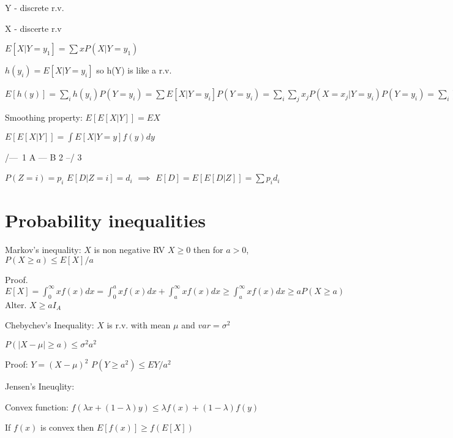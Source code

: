 \documentclass{article}
\begin{document}
Y - discrete r.v.

X - discerte r.v

$E[X|Y=y_1] = \sum x P(X|Y=y_1)$

$h(y_i) = E[X|Y=y_i]$ so h(Y) is like a r.v.

$E[h(y)] = \sum_i h(y_i)P(Y=y_i) = \sum E[X|Y=y_i]P(Y=y_i)  = \sum_i \sum_j x_j P(X=x_j|Y=y_i)P(Y=y_i) = \sum_i \sum_j x_j P(X=x_j, Y=y_j)
= \sum_j \sum_i x_j P(X=x_j)$

Smoothing property: $E[E[X|Y]] = EX$


$E[E[X|Y]] = \int E[X|Y=y] f(y) dy$
   
  /---\  1
 A --- B 2
  \---/  3

$P(Z=i)=p_i$
$E[D|Z=i] = d_i$ $\implies$ $E[D] = E[E[D|Z]] = \sum p_id_i$


\section{Probability inequalities}

Markov's inequality: 
$X$ is non negative RV $X \geq 0$ then for $a > 0$, $P(X \geq a) \leq E[X]/a$

Proof. $E[X] = \int_0^{\infty} xf(x)dx = \int_{0}^a xf(x)dx + \int_a^{\infty} xf(x)dx \geq \int_{a}^{\infty} xf(x) dx \geq aP(X\geq a) $
Alter. $X \geq a I_A$


Chebychev's Inequality:
$X$ is r.v. with mean $\mu$ and $var =\sigma^2$

$P(|X-\mu| \geq a) \leq \sigma^2 a^2$

Proof: $Y=(X-\mu)^2$ $P(Y \geq a^2) \leq EY/a^2$

Jensen's Ineuqlity:

Convex function: $f(\lambda x + (1-\lambda)y) \leq \lambda f(x) + (1-\lambda) f(y)$

If $f(x)$ is convex then $E[f(x)] \geq f(E[X])$

 
\end{document}
